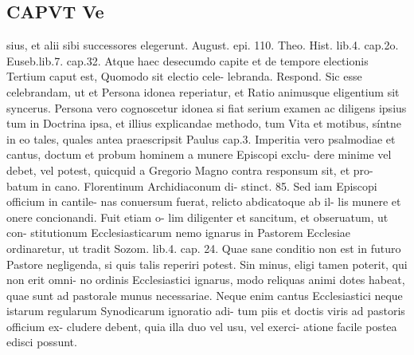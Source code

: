 \documentclass{article}
\begin{document}
\begin{pages}
\section*{CAPVT  Ve }
\marginpar{[ p.357 ]}sius, et alii sibi successores elegerunt. August. epi. 110. Theo. Hist. lib.4. cap.2o. Euseb.lib.7. cap.32. Atque haec desecumdo capite et de tempore electionis Tertium caput est, Quomodo sit electio cele- lebranda. Respond. Sic esse celebrandam, ut et Persona idonea reperiatur, et Ratio animusque eligentium sit syncerus. Persona vero cognoscetur idonea si fiat serium examen ac diligens ipsius tum in Doctrina ipsa, et illius explicandae methodo, tum Vita et motibus, síntne in eo tales, quales antea praescripsit Paulus cap.3. Imperitia vero psalmodiae et cantus, doctum et probum hominem a munere Episcopi exclu- dere minime vel debet, vel potest, quicquid a Gregorio Magno contra responsum sit, et pro- batum in cano. Florentinum Archidiaconum di- stinct. 85. Sed iam Episcopi officium in cantile- nas conuersum fuerat, relicto abdicatoque ab il- lis munere et onere concionandi. Fuit etiam o- lim diligenter et sancitum, et obseruatum, ut con- stitutionum Ecclesiasticarum nemo ignarus in Pastorem Ecclesiae ordinaretur, ut tradit Sozom. lib.4. cap. 24. Quae sane conditio non est in futuro Pastore negligenda, si quis talis reperiri potest. Sin minus, eligi tamen poterit, qui non erit omni- no ordinis Ecclesiastici ignarus, modo reliquas animi dotes habeat, quae sunt ad pastorale munus necessariae. Neque enim cantus Ecclesiastici neque istarum regularum Synodicarum ignoratio adi- tum piis et doctis viris ad pastoris officium ex- cludere debent, quia illa duo vel usu, vel exerci- atione facile postea edisci possunt. 

\end{pages}
\end{document}
